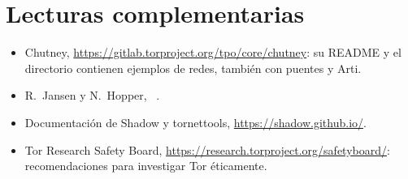 \section*{Lecturas complementarias}
\begin{itemize}
  \item Chutney, \url{https://gitlab.torproject.org/tpo/core/chutney}: su README y el directorio  contienen ejemplos de redes, también con puentes y Arti.
  \item R.~Jansen y N.~Hopper, ~\cite{jansen2012shadow}.
  \item Documentación de Shadow y tornettools, \url{https://shadow.github.io/}.
  \item Tor Research Safety Board, \url{https://research.torproject.org/safetyboard/}: recomendaciones para investigar Tor éticamente.
\end{itemize}
